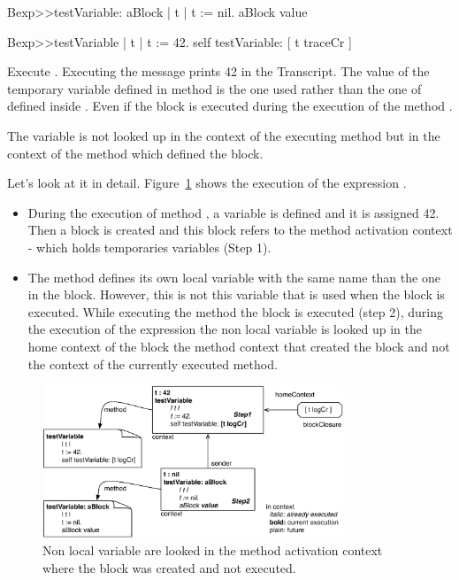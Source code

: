 \documentclass[a4paper,10pt,twoside]{book}
\begin{document}
\begin{code}{}
Bexp>>testVariable: aBlock
	| t |
	t := nil.
	aBlock value

Bexp>>testVariable
	| t |
	t := 42.
	self testVariable: [ t traceCr ]
\end{code}

Execute . Executing the  message  prints 42 in the Transcript. The value of the temporary variable  defined in method  is the one used rather than the one of  defined inside . Even if the block is executed during the execution of the method .

The variable  is not looked up in the context of the executing method  but in the context of the method  which defined the block.

Let's look at it in detail. Figure~\ref{fig:variable} shows the execution of the expression . 

\begin{itemize}
\item During the execution of method , a variable  is defined and it is assigned 42. Then a block is created and this block refers to the method activation context - which holds temporaries variables (Step 1). 

\item The method  defines its own local variable  with the same name than the one in the block. However, this is not this variable that is used when the block is executed. While executing the method  the block is executed (step 2), during the execution of the expression  the non local variable  is looked up in the home context of the block \ie the method context that created the block and not the context of the currently executed method.
\end{itemize}

\begin{figure}[!h]
\begin{center}\includegraphics[width=9cm]{variable}
\caption{ Non local variable are looked in the method activation context where the block was created and not executed.\label{fig:variable}}
\end{center}
\end{figure}
\end{document}
